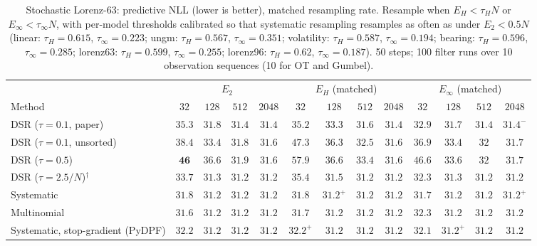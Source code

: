 \begin{table}[ht]
\centering
\small
\caption{Stochastic Lorenz-63: predictive NLL (lower is better), matched resampling rate. Resample when $E_H<\tau_HN$ or $E_\infty<\tau_\infty N$, with per-model thresholds calibrated so that systematic resampling resamples as often as under $E_2<0.5N$ (linear: $\tau_H{=}0.615$, $\tau_\infty{=}0.223$; ungm: $\tau_H{=}0.567$, $\tau_\infty{=}0.351$; volatility: $\tau_H{=}0.587$, $\tau_\infty{=}0.194$; bearing: $\tau_H{=}0.596$, $\tau_\infty{=}0.285$; lorenz63: $\tau_H{=}0.599$, $\tau_\infty{=}0.255$; lorenz96: $\tau_H{=}0.62$, $\tau_\infty{=}0.187$). 50 steps; 100 filter runs over 10 observation sequences (10 for OT and Gumbel).}
\label{tab:trigger-matched-lorenz63-predictive_nll}
\begin{adjustbox}{max width=\linewidth}
\begin{tabular}{lcccc|cccc|cccc}
\toprule
 & \multicolumn{4}{c}{$E_2$} & \multicolumn{4}{c}{$E_H$ (matched)} & \multicolumn{4}{c}{$E_\infty$ (matched)} \\
\cmidrule(lr){2-5} \cmidrule(lr){6-9} \cmidrule(lr){10-13}
Method & $32$ & $128$ & $512$ & $2048$ & $32$ & $128$ & $512$ & $2048$ & $32$ & $128$ & $512$ & $2048$ \\
\midrule
DSR ($\tau{=}0.1$, paper) & $35.3$ & $31.8$ & $\mathbf{31.4}$ & $\mathbf{31.4}$ & $35.2$ & $33.3$ & $31.6$ & $31.4$ & $\mathbf{32.9}$ & $\mathbf{31.7}$ & $31.4$ & $31.4^{-}$ \\
DSR ($\tau{=}0.1$, unsorted) & $38.4$ & $33.4$ & $\mathbf{31.8}$ & $\mathbf{31.6}$ & $47.3$ & $36.3$ & $32.5$ & $31.6$ & $\mathbf{36.9}$ & $\mathbf{33.4}$ & $32$ & $31.7$ \\
DSR ($\tau{=}0.5$) & $\mathbf{46}$ & $36.6$ & $\mathbf{31.9}$ & $\mathbf{31.6}$ & $57.9$ & $36.6$ & $33.4$ & $31.6$ & $46.6$ & $\mathbf{33.6}$ & $32$ & $31.7$ \\
DSR ($\tau{=}2.5/N$)$^\dagger$ & $33.7$ & $31.3$ & $31.2$ & $31.2$ & $35.4$ & $31.5$ & $\mathbf{31.2}$ & $31.2$ & $\mathbf{32.3}$ & $\mathbf{31.3}$ & $31.2$ & $\mathbf{31.2}$ \\
\midrule
Systematic & $31.8$ & $31.2$ & $\mathbf{31.2}$ & $31.2$ & $31.8$ & $\mathbf{31.2}^{+}$ & $31.2$ & $31.2$ & $\mathbf{31.7}$ & $31.2$ & $31.2$ & $\mathbf{31.2}^{+}$ \\
Multinomial & $\mathbf{31.6}$ & $\mathbf{31.2}$ & $\mathbf{31.2}$ & $31.2$ & $31.7$ & $31.2$ & $31.2$ & $\mathbf{31.2}$ & $32.3$ & $31.2$ & $\mathbf{31.2}$ & $31.2$ \\
Systematic, stop-gradient (PyDPF) & $32.2$ & $31.2$ & $31.2$ & $31.2$ & $32.2^{+}$ & $31.2$ & $\mathbf{31.2}$ & $31.2$ & $\mathbf{32.1}$ & $\mathbf{31.2}^{+}$ & $31.2$ & $\mathbf{31.2}$ \\

\end{tabular}
\end{adjustbox}
\end{table}
